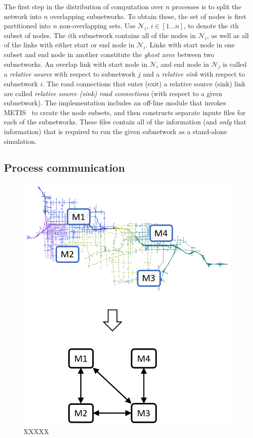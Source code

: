 The first step in the distribution of computation over $n$ processes is to split the network into $n$ overlapping subnetworks. To obtain these, the set of nodes is first partitioned into $n$ non-overlapping sets. Use $\mathcal{N}_i$, $i\in[1\hdots n]$, to denote the $i$th subset of nodes. The $i$th subnetwork contains all of the nodes in $\mathcal{N}_i$, as well as all of the links with either start or end node in $\mathcal{N}_i$. 
Links with start node in one subset and end node in another constitute the \textit{ghost zone} between two subnetworks. An overlap link with start node in $\mathcal{N}_i$ and end node in $\mathcal{N}_j$ is called a \textit{relative source} with respect to subnetwork $j$ and a \textit{relative sink} with respect to subnetwork $i$. The road connections that enter (exit) a relative source (sink) link are called \textit{relative source (sink) road connections} (with respect to a given subnetwork). The implementation includes an off-line module that invokes
METIS~\cite{kaku:98a} to create the node subsets, and then constructs separate inpute files for each of the subnetworks. These files contain all of the information (and \textit{only} that information) that is required to run the given subnetwork as a stand-alone simulation. 

\subsection{Process communication}

\begin{figure}[h!]
    \centering
    \includegraphics[width=0.7\columnwidth]{figs/metagraph.png}
    \caption{XXXXX}
    \label{fig:metagraph}
\end{figure}

